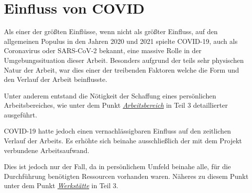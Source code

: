 \section{Einfluss von COVID}

\label{covid}

Als einer der größten Einflüsse, wenn nicht als größter Einfluss,  auf den allgemeinen Populus in den Jahren 2020 und 2021 spielte COVID-19, auch als Coronavirus oder SARS-CoV-2 bekannt, eine massive Rolle in der Umgebungssituation dieser Arbeit.
Besonders aufgrund der teils sehr physischen Natur der Arbeit, war dies einer der treibenden Faktoren welche die Form und den Verlauf der Arbeit beinflusste.

Unter anderem entstand die Nötigkeit der Schaffung eines persönlichen Arbeitsbereiches, wie unter dem Punkt \hyperref[arbeitsbereich]{\textit{Arbeitsbereich}} in Teil 3 detaillierter ausgeführt.

COVID-19 hatte jedoch einen vernachlässigbaren Einfluss auf den zeitlichen Verlauf der Arbeits. 
Es erhöhte sich beinahe ausschließlich der mit dem Projekt verbundene Arbeitsaufwand.

Dies ist jedoch nur der Fall, da in persönlichem Umfeld beinahe alle, für die Durchführung benötigten Ressourcen vorhanden waren. 
Näheres zu diesem Punkt unter dem Punkt \hyperref[werkstaette]{\textit{Werkstätte}} in Teil 3.